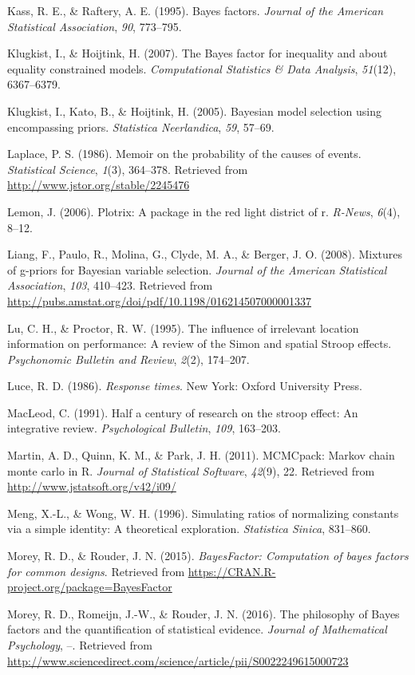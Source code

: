\documentclass[american,man]{apa6}
\begin{document}
Kass, R. E., \& Raftery, A. E. (1995). Bayes factors. \emph{Journal of
the American Statistical Association}, \emph{90}, 773--795.

Klugkist, I., \& Hoijtink, H. (2007). The Bayes factor for inequality
and about equality constrained models. \emph{Computational Statistics \&
Data Analysis}, \emph{51}(12), 6367--6379.

Klugkist, I., Kato, B., \& Hoijtink, H. (2005). Bayesian model selection
using encompassing priors. \emph{Statistica Neerlandica}, \emph{59},
57--69.

Laplace, P. S. (1986). Memoir on the probability of the causes of
events. \emph{Statistical Science}, \emph{1}(3), 364--378. Retrieved
from \url{http://www.jstor.org/stable/2245476}

Lemon, J. (2006). Plotrix: A package in the red light district of r.
\emph{R-News}, \emph{6}(4), 8--12.

Liang, F., Paulo, R., Molina, G., Clyde, M. A., \& Berger, J. O. (2008).
Mixtures of g-priors for Bayesian variable selection. \emph{Journal of
the American Statistical Association}, \emph{103}, 410--423. Retrieved
from \url{http://pubs.amstat.org/doi/pdf/10.1198/016214507000001337}

Lu, C. H., \& Proctor, R. W. (1995). The influence of irrelevant
location information on performance: A review of the Simon and spatial
Stroop effects. \emph{Psychonomic Bulletin and Review}, \emph{2}(2),
174--207.

Luce, R. D. (1986). \emph{Response times}. New York: Oxford University
Press.

MacLeod, C. (1991). Half a century of research on the stroop effect: An
integrative review. \emph{Psychological Bulletin}, \emph{109}, 163--203.

Martin, A. D., Quinn, K. M., \& Park, J. H. (2011). MCMCpack: Markov
chain monte carlo in R. \emph{Journal of Statistical Software},
\emph{42}(9), 22. Retrieved from \url{http://www.jstatsoft.org/v42/i09/}

Meng, X.-L., \& Wong, W. H. (1996). Simulating ratios of normalizing
constants via a simple identity: A theoretical exploration.
\emph{Statistica Sinica}, 831--860.

Morey, R. D., \& Rouder, J. N. (2015). \emph{BayesFactor: Computation of
bayes factors for common designs}. Retrieved from
\url{https://CRAN.R-project.org/package=BayesFactor}

Morey, R. D., Romeijn, J.-W., \& Rouder, J. N. (2016). The philosophy of
Bayes factors and the quantification of statistical evidence.
\emph{Journal of Mathematical Psychology}, --. Retrieved from
\url{http://www.sciencedirect.com/science/article/pii/S0022249615000723}
\end{document}
